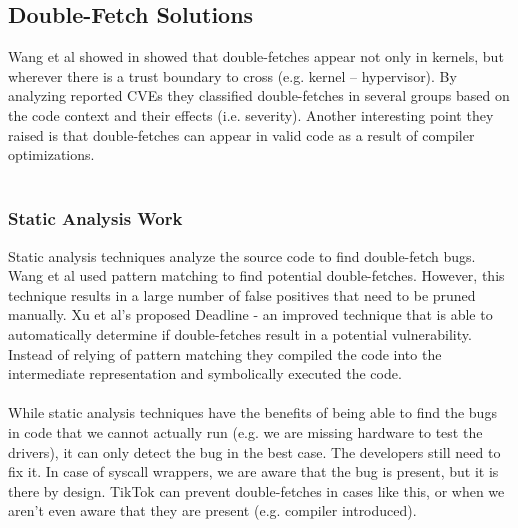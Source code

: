 \subsection{Double-Fetch Solutions}

Wang et al showed in \cite{wang07} showed that double-fetches appear not only in kernels, but wherever there is a trust boundary to cross (e.g. kernel -- hypervisor).
By analyzing reported CVEs they classified double-fetches in several groups based on the code context and their effects (i.e. severity). Another interesting point they raised
is that double-fetches can appear in valid code as a result of compiler optimizations.
\\
\\

\subsubsection{Static Analysis Work}
Static analysis techniques analyze the source code to find double-fetch bugs. Wang et al \cite{usenixwang07} used pattern matching to find potential double-fetches. However, 
this technique results in a large number of false positives that need to be pruned manually. Xu et al's \cite{xu18} proposed Deadline - an improved technique that is
able to automatically determine if double-fetches result in a potential vulnerability. Instead of relying of pattern matching they compiled the code into the intermediate representation
and symbolically executed the code.
\\
\\
While static analysis techniques have the benefits of being able to find the bugs in code that we cannot actually run (e.g. we are missing hardware to test the drivers), it can only 
detect the bug in the best case. The developers still need to fix it. In case of syscall wrappers, we are aware that the bug is present, but it is there by design. TikTok can prevent
double-fetches in cases like this, or when we aren't even aware that they are present (e.g. compiler introduced).
\\
\\

